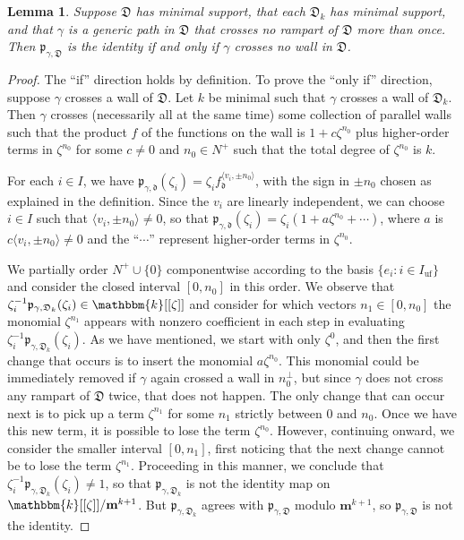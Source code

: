 \documentclass{amsart}
\newtheorem{lemma}[proposition]{Lemma}
\theoremstyle{definition}
\theoremstyle{remark}
\numberwithin{equation}{section}
\newcommand{\uf}{{\operatorname{uf}}}
\newcommand{\set}[1]{{\lbrace #1 \rbrace}}
\newcommand{\br}[1]{{\langle #1 \rangle}}
\newcommand{\D}{{\mathfrak D}}
\newcommand{\p}{{\mathfrak p}}
\newcommand{\0}{{\mathbf{0}}}
\newcommand{\m}{\mathbf{m}}
\renewcommand{\k}{\mathbbm{k}}
\renewcommand{\d}{{\mathfrak d}}
\begin{document}
\begin{lemma}\label{tech lem}
Suppose $\D$ has minimal support, that each $\D_k$ has minimal support, and that $\gamma$ is a generic path in $\D$ that crosses no rampart of $\D$ more than once.
Then $\p_{\gamma,\D}$ is the identity if and only if $\gamma$ crosses no wall in $\D$.
\end{lemma}
\begin{proof}
The ``if'' direction holds by definition.
To prove the ``only if'' direction, suppose $\gamma$ crosses a wall of $\D$.
Let $k$ be minimal such that $\gamma$ crosses a wall of $\D_k$.
Then $\gamma$ crosses (necessarily all at the same time) some collection of parallel walls such that the product $f$ of the functions on the wall is $1+c\zeta^{n_0}$ plus higher-order terms in $\zeta^{n_0}$ for some $c\neq 0$ and $n_0\in N^+$ such that the total degree of $\zeta^{n_0}$ is $k$.

For each $i\in I$, we have $\p_{\gamma,\d}(\zeta_i)=\zeta_if_\d^{\br{v_i,\pm n_0}}$, with the sign in $\pm n_0$ chosen as explained in the definition.
Since the $v_i$ are linearly independent, we can choose $i\in I$ such that $\br{v_i,\pm n_0}\neq0$, so that $\p_{\gamma,\d}(\zeta_i)=\zeta_i(1+a\zeta^{n_0}+\cdots)$, where $a$ is $c\br{v_i,\pm n_0}\neq0$ and the ``$\cdots$'' represent higher-order terms in $\zeta^{n_0}$.

We partially order $N^+\cup\set{0}$ componentwise according to the basis $\set{e_i:i\in I_\uf}$ and consider the closed interval $[0,n_0]$ in this order.
We observe that $\zeta_i^{-1}\p_{\gamma,\D_k}(\zeta_i)\in \k[[\zeta]]$ and consider for which vectors $n_1\in[0,n_0]$ the monomial $\zeta^{n_1}$ appears with nonzero coefficient in each step in evaluating $\zeta_i^{-1}\p_{\gamma,\D_k}(\zeta_i)$.
As we have mentioned, we start with only $\zeta^0$, and then the first change that occurs is to insert the monomial $a\zeta^{n_0}$.
This monomial could be immediately removed if $\gamma$ again crossed a wall in $n_0^\perp$, but since $\gamma$ does not cross any rampart of $\D$ twice, that does not happen.
The only change that can occur next is to pick up a term $\zeta^{n_1}$ for some $n_1$ strictly between $0$ and $n_0$.
Once we have this new term, it is possible to lose the term $\zeta^{n_0}$.
However, continuing onward, we consider the smaller interval $[0,n_1]$, first noticing that the next change cannot be to lose the term $\zeta^{n_1}$.
Proceeding in this manner, we conclude that $\zeta_i^{-1}\p_{\gamma,\D_k}(\zeta_i)\neq 1$, so that $\p_{\gamma,\D_k}$ is not the identity map on $\k[[\zeta]]/\m^{k+1}$.
But $\p_{\gamma,\D_k}$ agrees with $\p_{\gamma,\D}$ modulo $\m^{k+1}$, so $\p_{\gamma,\D}$ is not the identity.
\end{proof}
\end{document}
